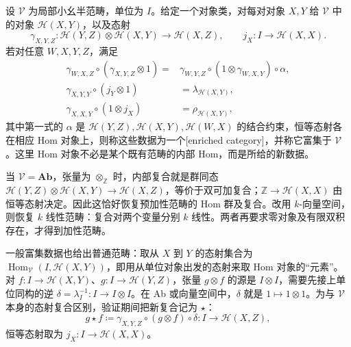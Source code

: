 \begin{definition}\label{b4:def:enriched-category}
	设 \(\mathcal V\) 为局部小幺半范畴，单位为 \(I\)。给定一个对象类，对每对对象 \(X,Y\) 给 \(\mathcal V\) 中的对象 \(\mathcal H(X,Y)\)，以及态射
	\[
		\gamma_{X,Y,Z}:\mathcal H(Y,Z)\otimes\mathcal H(X,Y)\longrightarrow\mathcal H(X,Z), \qquad j_X:I\longrightarrow\mathcal H(X,X).
	\]
	若对任意 \(W,X,Y,Z\)，满足
	\[
		\begin{aligned}
			\gamma_{W,X,Z}\circ(\gamma_{X,Y,Z}\otimes1) ={}&\gamma_{W,Y,Z}\circ(1\otimes\gamma_{W,X,Y}) \circ\alpha,\\
			\gamma_{X,Y,Y}\circ(j_Y\otimes1)&=\lambda_{\mathcal H(X,Y)},\\
			\gamma_{X,X,Y}\circ(1\otimes j_X)&=\rho_{\mathcal H(X,Y)},
		\end{aligned}
	\]
	其中第一式的 \(\alpha\) 是 \(\mathcal H(Y,Z),\mathcal H(X,Y),\mathcal H(W,X)\) 的结合约束，恒等态射各在相应 Hom 对象上，则称这些数据为一个[enriched category]，并称它富集于 \(\mathcal V\)。这里 Hom 对象不必是某个既有范畴的内部 Hom，而是所给的新数据。
\end{definition}

当 \(\mathcal V=\mathbf{Ab}\)，张量为 \(\otimes_{\mathbb Z}\) 时，内部复合就是群同态 \(\mathcal H(Y,Z)\otimes\mathcal H(X,Y)\to\mathcal H(X,Z)\)，等价于双可加复合；\(\mathbb Z\to\mathcal H(X,X)\) 由恒等态射决定。因此这恰好恢复预加性范畴的 Hom 群及复合。改用 \(k\)-向量空间，则恢复 \(k\) 线性范畴：复合对两个变量分别 \(k\) 线性。两者再要求零对象及有限双积存在，才得到加性范畴。

\ProseParagraphBreak

一般富集数据也给出普通范畴：取从 \(X\) 到 \(Y\) 的态射集合为 \(\operatorname{Hom}_{\mathcal V}(I,\mathcal H(X,Y))\)，即用从单位对象出发的态射来取 Hom 对象的“元素”。对 \(f:I\to\mathcal H(X,Y)\)、\(g:I\to\mathcal H(Y,Z)\)，张量 \(g\otimes f\) 的源是 \(I\otimes I\)，需要先接上单位同构的逆 \(\delta=\lambda_I^{-1}:I\to I\otimes I\)。在 Ab 或向量空间中，\(\delta\) 就是 \(1\mapsto1\otimes1\)。为与 \(\mathcal V\) 本身的态射复合区别，验证期间把新复合记为 \(\star\)：
\[
	g\star f\coloneqq\gamma_{X,Y,Z}\circ(g\otimes f)\circ\delta :I\longrightarrow\mathcal H(X,Z),
\]
恒等态射取为 \(j_X:I\to\mathcal H(X,X)\)。

\ProseParagraphBreak

